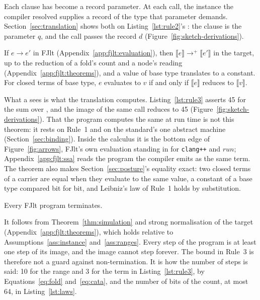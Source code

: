 Each  clause has become a record parameter.
At each call, the instance the compiler resolved supplies a record of the type that parameter demands.
Section~\ref{sec:translation} shows both on Listing~\ref{lst:rule2}'s : the clause is the parameter $q$, and the call passes the record $d$ (Figure~\ref{fig:sketch-derivations}).

\begin{theorem}[Simulation]
\label{thm:simulation}
If $e \longrightarrow e'$ in FJlt (Appendix~\ref{app:fjlt:evaluation}), then $\llbracket e \rrbracket \longrightarrow^{+} \llbracket e' \rrbracket$ in the target, up to the reduction of a fold's count and a node's reading (Appendix~\ref{app:fjlt:theorems}), and a value of base type translates to a constant.
For closed terms of base type, $e$ evaluates to $v$ if and only if $\llbracket e \rrbracket$ reduces to $\llbracket v \rrbracket$.
\end{theorem}

What a  sees is what the translation computes.
Listing~\ref{lst:rule3} asserts 45 for the sum over , and the image of the same call reduces to 45 (Figure~\ref{fig:sketch-derivations}).
That the program computes the same at run time is not this theorem: it rests on Rule~1 and on the standard's one abstract machine (Section~\ref{sec:binding}).
Inside the calculus it is the bottom edge of Figure~\ref{fig:arrows}, FJlt's own evaluation standing in for \texttt{clang++} and $\mathit{run}$; Appendix~\ref{app:fjlt:ssa} reads the program the compiler emits as the same term.
The theorem also makes Section~\ref{sec:posture}'s equality exact: two closed terms of a carrier are equal when they evaluate to the same value, a constant of a base type compared bit for bit, and Leibniz's law of Rule~1 holds by substitution.

\begin{corollary}[Termination]
\label{cor:termination}
Every FJlt program terminates.
\end{corollary}

It follows from Theorem~\ref{thm:simulation} and strong normalisation of the target (Appendix~\ref{app:fjlt:theorems}), which holds relative to Assumptions~\ref{ass:instance} and~\ref{ass:ranges}.
Every step of the program is at least one step of its image, and the image cannot step forever.
The bound in Rule~3 is therefore not a guard against non-termination.
It is how the number of steps is said: 10 for the range and 3 for the term in Listing~\ref{lst:rule3}, by Equations~\eqref{eq:fold} and~\eqref{eq:cata}, and the number of bits of the count, at most 64, in Listing~\ref{lst:laws}.

